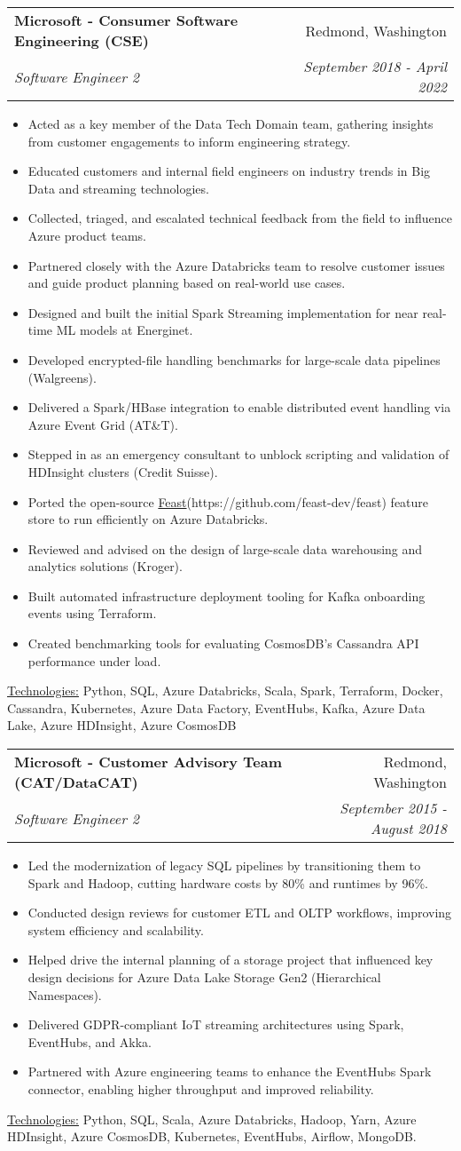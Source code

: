 \documentclass[letterpaper,11pt]{article}
\makeatletter
\newcommand{\sepsection}{\vspace{25pt}}
\newcommand{\resumeItem}[1]{%
  \item\small{
    #1
  }
}
\newcommand{\resumeSubheading}[4]{
  \vspace{8pt}\item%
    \begin{tabular*}{0.97\textwidth}[t]{l@{\extracolsep{\fill}}r}
      \textbf{#1} & #2 \\
      \textit{\small#3} & \textit{\small #4} \\
    \end{tabular*}\vspace{-5pt}
}
\newcommand{\resumeItemListStart}{\begin{itemize}}
\newcommand{\resumeItemListEnd}{\end{itemize}\vspace{-5pt}}
\newcommand{\resumeTech}[2]{
 \underline{#1:} #2
}
\makeatother
\begin{document}
    \newpage

    \resumeSubheading
      {Microsoft - Consumer Software Engineering (CSE)}{Redmond, Washington}
      {Software Engineer 2}{September 2018 - April 2022}
      \resumeItemListStart
      \resumeItem{Acted as a key member of the Data Tech Domain team, gathering insights from customer engagements to inform engineering strategy.}
      \resumeItem{Educated customers and internal field engineers on industry trends in Big Data and streaming technologies.}
      \resumeItem{Collected, triaged, and escalated technical feedback from the field to influence Azure product teams.}
      \resumeItem{Partnered closely with the Azure Databricks team to resolve customer issues and guide product planning based on real-world use cases.}
      \resumeItem{Designed and built the initial Spark Streaming implementation for near real-time ML models at Energinet.}
      \resumeItem{Developed encrypted-file handling benchmarks for large-scale data pipelines (Walgreens).}
      \resumeItem{Delivered a Spark/HBase integration to enable distributed event handling via Azure Event Grid (AT&T).}
      \resumeItem{Stepped in as an emergency consultant to unblock scripting and validation of HDInsight clusters (Credit Suisse).}
      \resumeItem{Ported the open-source \href{https://github.com/feast-dev/feast}{Feast}(https://github.com/feast-dev/feast) feature store to run efficiently on Azure Databricks.}
      \resumeItem{Reviewed and advised on the design of large-scale data warehousing and analytics solutions (Kroger).}
      \resumeItem{Built automated infrastructure deployment tooling for Kafka onboarding events using Terraform.}
      \resumeItem{Created benchmarking tools for evaluating CosmosDB’s Cassandra API performance under load.}
      \resumeItemListEnd
      \resumeTech{Technologies}{Python, SQL, Azure Databricks, Scala, Spark, Terraform, Docker, Cassandra, Kubernetes, Azure Data Factory, EventHubs, Kafka, Azure Data Lake, Azure HDInsight, Azure CosmosDB}\\
      
    \sepsection

    \resumeSubheading
      {Microsoft - Customer Advisory Team (CAT/DataCAT)}{Redmond, Washington}
      {Software Engineer 2}{September 2015 - August 2018}
      \resumeItemListStart
      \resumeItem{Led the modernization of legacy SQL pipelines by transitioning them to Spark and Hadoop, cutting hardware costs by 80\% and runtimes by 96\%.}
      \resumeItem{Conducted design reviews for customer ETL and OLTP workflows, improving system efficiency and scalability.}
      \resumeItem{Helped drive the internal planning of a storage project that influenced key design decisions for Azure Data Lake Storage Gen2 (Hierarchical Namespaces).}
      \resumeItem{Delivered GDPR-compliant IoT streaming architectures using Spark, EventHubs, and Akka.}
      \resumeItem{Partnered with Azure engineering teams to enhance the EventHubs Spark connector, enabling higher throughput and improved reliability.}
      \resumeItemListEnd
      \resumeTech{Technologies}{Python, SQL, Scala, Azure Databricks, Hadoop, Yarn, Azure HDInsight, Azure CosmosDB, Kubernetes, EventHubs, Airflow, MongoDB.}\\
\end{document}
